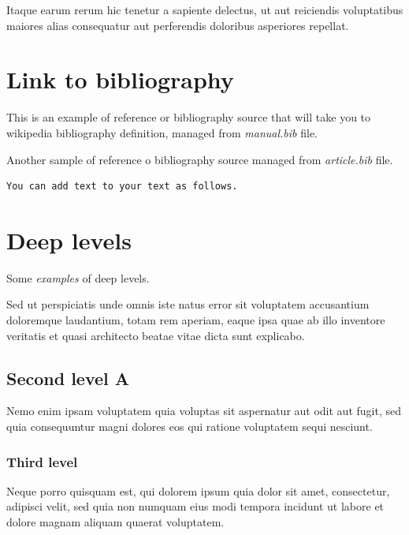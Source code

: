 \documentclass[
  english,
  a4paper,
  openany]{book}
\begin{document}
Itaque earum rerum hic tenetur a sapiente delectus, ut aut reiciendis voluptatibus maiores alias consequatur aut perferendis doloribus asperiores repellat.

\hypertarget{Link-to-bibliography}{%
\chapter{Link to bibliography}\label{Link-to-bibliography}}

This is an example of reference or bibliography source \citep{example-ref} that will take you to wikipedia bibliography definition, managed from \emph{manual.bib} file.

Another sample of reference o bibliography source \citep{article} managed from \emph{article.bib} file.

\begin{verbatim}
You can add text to your text as follows.
\end{verbatim}

\hypertarget{levels}{%
\chapter{Deep levels}\label{levels}}

Some \emph{examples} of deep levels.

Sed ut perspiciatis unde omnis iste natus error sit voluptatem accusantium doloremque laudantium, totam rem aperiam, eaque ipsa quae ab illo inventore veritatis et quasi architecto beatae vitae dicta sunt explicabo.

\hypertarget{second-level-a}{%
\section{Second level A}\label{second-level-a}}

Nemo enim ipsam voluptatem quia voluptas sit aspernatur aut odit aut fugit, sed quia consequuntur magni dolores eos qui ratione voluptatem sequi nesciunt.

\hypertarget{third-level}{%
\subsection{Third level}\label{third-level}}

Neque porro quisquam est, qui dolorem ipsum quia dolor sit amet, consectetur, adipisci velit, sed quia non numquam eius modi tempora incidunt ut labore et dolore magnam aliquam quaerat voluptatem.
\end{document}
